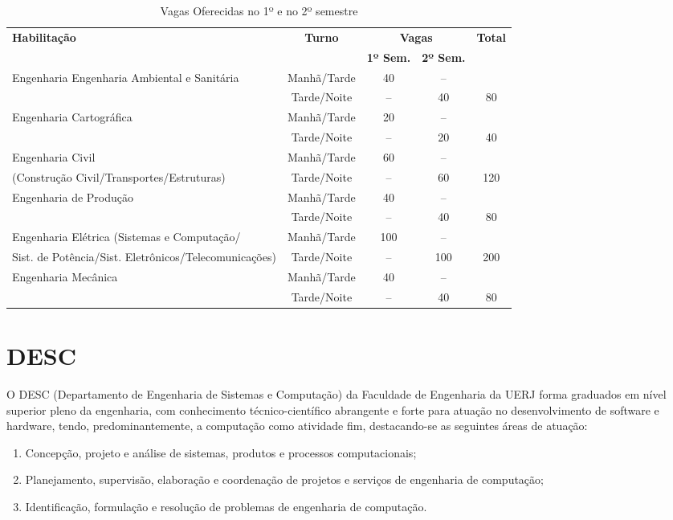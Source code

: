 \setlength{\tabcolsep}{5pt}
\begin{table}
\centering
\caption{Vagas Oferecidas no 1º e no 2º semestre}
\label{tabvagas}
\renewcommand{\arraystretch}{1.5}
\begin{tabularx}{\textwidth}{|X|c|c|c|c|}
\hline
\multirow{2}{*}{\textbf{Habilitação}} & \multirow{2}{*}{\textbf{Turno}} & \multicolumn{2}{|c|}{\textbf{Vagas}} & \multirow{2}{*}{\textbf{Total}} \\\cline{3-4}
 & & \textbf{1º Sem.} & \textbf{2º Sem.} & \\
 \hline
 Engenharia Engenharia Ambiental 
 e Sanitária  & Manhã/Tarde & 40  & -- &   \\
  & Tarde/Noite & -- & 40 & 80 \\
\hline
Engenharia Cartográfica & Manhã/Tarde & 20  & -- &   \\
& Tarde/Noite & -- & 20 & 40 \\
 \hline
Engenharia Civil & Manhã/Tarde & 60  & -- &   \\
(Construção Civil/Transportes/Estruturas)  & Tarde/Noite & -- & 60 & 120 \\
 \hline
Engenharia de Produção & Manhã/Tarde & 40  & -- &   \\
& Tarde/Noite & -- & 40 & 80 \\
\hline
Engenharia Elétrica (Sistemas e Computação/
& Manhã/Tarde & 100  & -- &   \\
 Sist. de Potência/Sist. Eletrônicos/Telecomunicações)& Tarde/Noite & -- & 100 & 200 \\
\hline
Engenharia Mecânica & Manhã/Tarde & 40  & -- &   \\
 & Tarde/Noite & -- & 40 & 80 \\
 \hline
\end{tabularx}
\end{table}

\chapter{DESC}

O DESC (Departamento de Engenharia de Sistemas e Computação) da Faculdade de Engenharia da UERJ forma graduados em nível superior pleno da engenharia, com conhecimento técnico-científico abrangente e forte para atuação no desenvolvimento de software e hardware, tendo, predominantemente, a computação como atividade fim, destacando-se as seguintes áreas de atuação:
\begin{enumerate}
\item Concepção, projeto e análise de sistemas, produtos e processos computacionais;
\item Planejamento, supervisão, elaboração e coordenação de projetos e serviços de engenharia de computação;
\item Identificação, formulação e resolução de problemas de engenharia de computação.
\end{enumerate}
  
